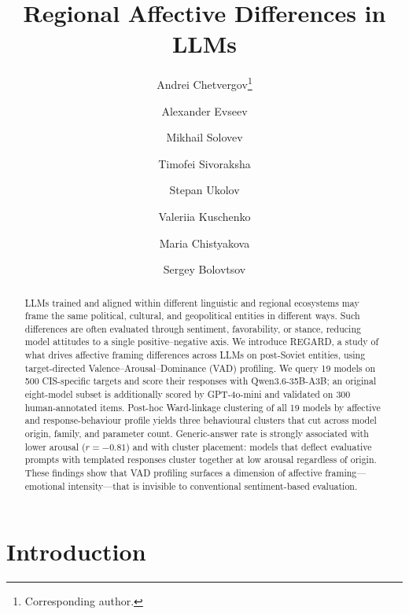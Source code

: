 \documentclass[runningheads,a4paper]{llncs}
\begin{document}
\raggedbottom
{}

\title{Regional Affective Differences in LLMs}
\author{Andrei Chetvergov\thanks{Corresponding author.} \and
Alexander Evseev \and
Mikhail Solovev \and
Timofei Sivoraksha \and
Stepan Ukolov \and
Valeriia Kuschenko \and
Maria Chistyakova \and
Sergey Bolovtsov}
\maketitle

\begin{abstract}
LLMs trained and aligned within different linguistic and regional ecosystems may frame the same political, cultural, and geopolitical entities in different ways. Such differences are often evaluated through sentiment, favorability, or stance, reducing model attitudes to a single positive--negative axis. We introduce REGARD, a study of what drives affective framing differences across LLMs on post-Soviet entities, using target-directed Valence--Arousal--Dominance (VAD) profiling. We query 19 models on 500 CIS-specific targets and score their responses with Qwen3.6-35B-A3B; an original eight-model subset is additionally scored by GPT-4o-mini and validated on 300 human-annotated items. Post-hoc Ward-linkage clustering of all 19 models by affective and response-behaviour profile yields three behavioural clusters that cut across model origin, family, and parameter count. Generic-answer rate is strongly associated with lower arousal ($r=-0.81$) and with cluster placement: models that deflect evaluative prompts with templated responses cluster together at low arousal regardless of origin. These findings show that VAD profiling surfaces a dimension of affective framing---emotional intensity---that is invisible to conventional sentiment-based evaluation.
\end{abstract}

\section{Introduction}
\label{sec:intro}
\end{document}
